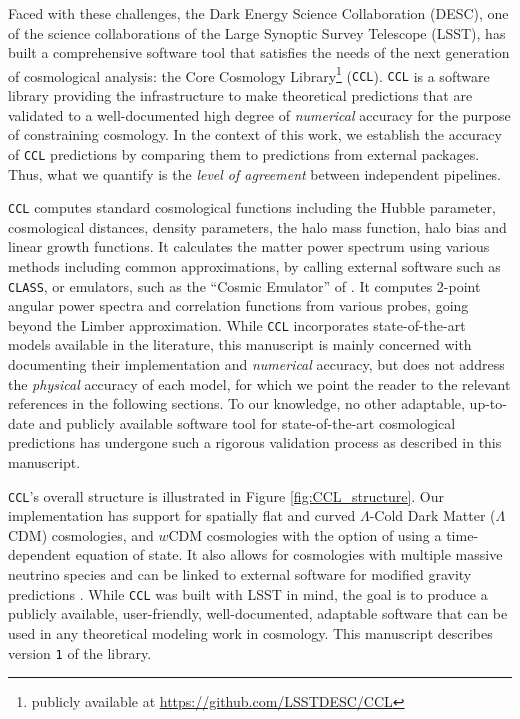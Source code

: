 \documentclass[\docopts]{\docclass}
\newcommand{\ccl}{{\tt CCL}\xspace}
\newcommand{\class}{{\tt CLASS}\xspace}
\newcommand{\hiclass}{{\tt hi$\_$CLASS\xspace}}
\begin{document}
Faced with these challenges, the Dark Energy Science Collaboration (DESC), one of the science collaborations of the Large Synoptic Survey Telescope (LSST), has built a comprehensive software tool that satisfies the needs of the next generation of cosmological analysis: the Core Cosmology Library\footnote{publicly available at \url{https://github.com/LSSTDESC/CCL}} (\ccl). \ccl is a software library providing the infrastructure to make theoretical predictions that are validated to a well-documented high degree of {\it numerical} accuracy for the purpose of constraining cosmology. In the context of this work, we establish the accuracy of \ccl predictions by comparing them to predictions from external packages. Thus, what we quantify is the {\it level of agreement} between independent pipelines.

\ccl computes standard cosmological functions including the Hubble parameter, cosmological distances, density parameters, the halo mass function, halo bias and linear growth functions. It calculates the matter power spectrum using various methods including common approximations, by calling external software such as \class \citep{class}, or emulators, such as the ``Cosmic Emulator'' of \citet{Lawrence17}. It computes 2-point angular power spectra and correlation functions from various probes, going beyond the Limber approximation. While \ccl incorporates state-of-the-art models available in the literature, this manuscript is mainly concerned with documenting their implementation and {\it numerical} accuracy, but does not address the {\it physical} accuracy of each model, for which we point the reader to the relevant references in the following sections. To our knowledge, no other adaptable, up-to-date and publicly available software tool for state-of-the-art cosmological predictions has undergone such a rigorous validation process as described in this manuscript.  

\ccl 's overall structure is illustrated in Figure \ref{fig:CCL_structure}. Our implementation has support for spatially flat and curved $\Lambda$-Cold Dark Matter ($\Lambda$CDM) cosmologies, and $w$CDM cosmologies with the option of using a time-dependent equation of state. It also allows for cosmologies with multiple massive neutrino species and can be linked to external software for modified gravity predictions \citep[\hiclass,][]{Zumalacarregui17}. While \ccl was built with LSST in mind, the goal is to produce a publicly available, user-friendly, well-documented, adaptable software that can be used in any theoretical modeling work in cosmology. This manuscript describes version {\tt 1} of the library.
\end{document}
